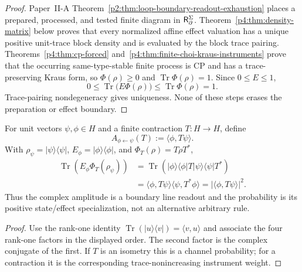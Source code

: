 \documentclass[12pt,a4paper]{article}
\begin{document}
\begin{proof}
Paper~II-A Theorem~\ref{p2:thm:loop-boundary-readout-exhaustion} places a
prepared, processed, and tested finite diagram in \(\mathsf R_{\partial}^{\Sigma}\).
Theorem~\ref{p4:thm:density-matrix} below proves that every normalized affine
effect valuation has a unique positive unit-trace block density and is
evaluated by the block trace pairing.  Theorems~\ref{p4:thm:cp-forced}
and~\ref{p4:thm:finite-choi-kraus-instruments} prove that the occurring
same-type-stable finite process is CP and has a trace-preserving Kraus form,
so \(\Phi(\rho)\ge0\) and
\(\operatorname{Tr}\Phi(\rho)=1\).  Since \(0\le E\le1\),
\[
 0\le
 \operatorname{Tr}\!\bigl(E\Phi(\rho)\bigr)
 \le\operatorname{Tr}\Phi(\rho)=1.
\]
Trace-pairing nondegeneracy gives uniqueness.  None of these steps erases the
preparation or effect boundary.
\end{proof}

\begin{corollary}
\label{p4:cor:pure-amplitude-born-square}
For unit vectors \(\psi,\phi\in H\) and a finite contraction
\(T:H\to H\), define
\[
 A_{\phi\leftarrow\psi}(T):=\langle\phi,T\psi\rangle .
\]
With
\(\rho_\psi=\lvert\psi\rangle\langle\psi\rvert\),
\(E_\phi=\lvert\phi\rangle\langle\phi\rvert\), and
\(\Phi_T(\rho)=T\rho T^*\),
\[
\boxed{
\begin{aligned}
\operatorname{Tr}\!\left(E_\phi\Phi_T(\rho_\psi)\right)
&=\operatorname{Tr}\!\left(
\lvert\phi\rangle\langle\phi\rvert
T\lvert\psi\rangle\langle\psi\rvert T^*\right)\\
&=\langle\phi,T\psi\rangle
  \langle\psi,T^*\phi\rangle
=\lvert\langle\phi,T\psi\rangle\rvert^2 .
\end{aligned}}
\]
Thus the complex amplitude is a boundary line readout and the probability is
its positive state/effect specialization, not an alternative arbitrary rule.
\end{corollary}

\begin{proof}
Use the rank-one identity
\(\operatorname{Tr}(\lvert u\rangle\langle v\rvert)=\langle v,u\rangle\)
and associate the four rank-one factors in the displayed order.  The second
factor is the complex conjugate of the first.  If \(T\) is an isometry this is
a channel probability; for a contraction it is the corresponding
trace-nonincreasing instrument weight.
\end{proof}
\end{document}
